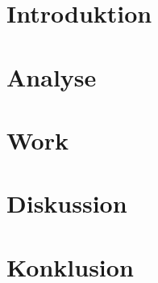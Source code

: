 
\usepackage[disable]{todonotes}					%
\usepackage[draft]{fixme}


	
	\clearpage
	\newpage\null\thispagestyle{empty}
	
	\addtocounter{page}{4}
	
	\newpage\null\thispagestyle{empty}\newpage
	\label{startoftoc}
	\begin{KeepFromToc}
		\tableofcontents
		\newpage\null\thispagestyle{empty}\newpage
		\todototoc
		\listoftodos
	\end{KeepFromToc}
	\label{endoftoc}
	
	\chapter{Introduktion}
	\chapter{Analyse}
	
	
	
	\chapter{Work}
	
	
	\chapter{Diskussion}
	\chapter{Konklusion}
	
	
	
	\label{lastpagewithoutappendix}

	\appendix
	\cleardoublepage

